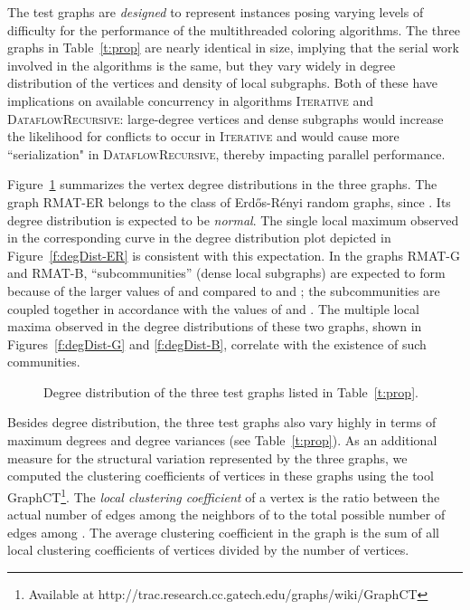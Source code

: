 \documentclass{article}
\begin{document}
The test graphs are {\em designed} to represent instances 
posing varying levels of difficulty for the performance of the multithreaded coloring algorithms. 
The three graphs in Table~\ref{t:prop} are nearly identical in size, 
implying that the serial work involved in the algorithms is the same, 
but they vary widely in degree distribution of the vertices and
density of local subgraphs. Both of these have implications on available concurrency in algorithms \textsc{Iterative} and \textsc{DataflowRecursive}: 
large-degree vertices and dense subgraphs would increase the likelihood for conflicts to occur 
in \textsc{Iterative} and would cause more ``serialization" in \textsc{DataflowRecursive}, 
thereby impacting parallel performance.

Figure~\ref{f:deg-Dist} summarizes the vertex degree distributions in the three graphs.
The graph RMAT-ER belongs to the class of Erd\H os-R\'enyi random graphs,
since . Its degree distribution is expected to be {\em normal}.
The single local maximum observed in the corresponding curve in the degree distribution plot
depicted in Figure~\ref{f:degDist-ER} is consistent with this expectation.
In the graphs RMAT-G and RMAT-B, ``subcommunities'' (dense local subgraphs)  
are expected to form because of the larger values of  and  
compared to  and ; the subcommunities are coupled together 
in accordance with the values of  and .
The multiple local maxima observed in the degree distributions of these two graphs,
shown in Figures~\ref{f:degDist-G} and \ref{f:degDist-B}, 
correlate with the existence of such communities.

\begin{figure}
\centering
{}
\caption{Degree distribution of the three test graphs listed in Table~\ref{t:prop}.}
\label{f:deg-Dist}
\end{figure}

Besides degree distribution, the three test graphs  also vary highly
in terms of maximum degrees and degree variances (see Table~\ref{t:prop}).
As an additional measure for the structural variation represented by the three graphs, 
we computed the clustering coefficients of vertices in these graphs
using the tool GraphCT\footnote{Available at http://trac.research.cc.gatech.edu/graphs/wiki/GraphCT}.
The {\em local clustering coefficient} of a vertex  is the ratio between the actual number of edges 
among the neighbors  of  to the total possible number of edges 
among  \cite{citeulike:99}. 
The average clustering coefficient in the graph is the sum of all local clustering coefficients 
of vertices divided by the number of vertices.
\end{document}
